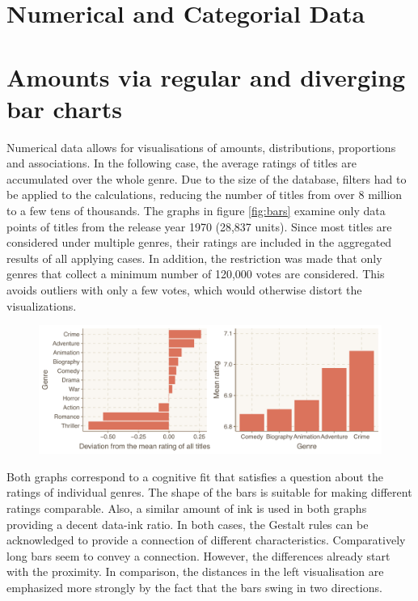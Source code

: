 \section{Numerical and Categorial Data}

\section*{Amounts via regular and diverging bar charts}

Numerical data allows for visualisations of amounts, distributions, proportions and associations. In the following case, the average ratings of titles are accumulated over the whole genre. Due to the size of the database, filters had to be applied to the calculations, reducing the number of titles from over 8 million to a few tens of thousands. The graphs in figure \ref{fig:bars} examine only data points of titles from the release year 1970 (28,837 units). Since most titles are considered under multiple genres, their ratings are included in the aggregated results of all applying cases. In addition, the restriction was made that only genres that collect a minimum number of 120,000 votes are considered. This avoids outliers with only a few votes, which would otherwise distort the visualizations. 

\begin{figure}[caption={Best voted genres in 1970 via diverging (left) and  regular bar chart}, label={fig:bars}]
	{\includegraphics[width=14.5cm]{figures/bars.pdf}}
\end{figure} 

Both graphs correspond to a cognitive fit that satisfies a question about the ratings of individual genres. The shape of the bars is suitable for making different ratings comparable. Also, a similar amount of ink is used in both graphs providing a decent data-ink ratio. In both cases, the Gestalt rules can be acknowledged to provide a connection of different characteristics. Comparatively long bars seem to convey a connection. However, the differences already start with the proximity. In comparison, the distances in the left visualisation are emphasized more strongly by the fact that the bars swing in two directions.

